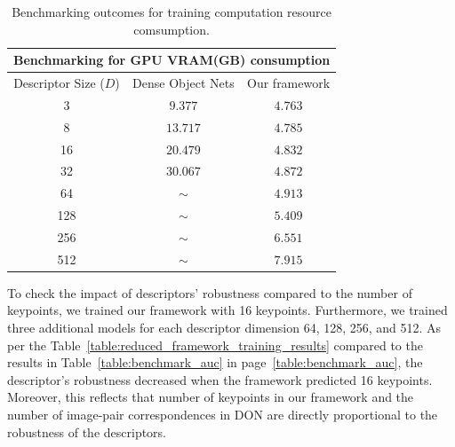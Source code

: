 \begin{table}[htb]
    \caption{Benchmarking outcomes for training computation resource comsumption.}
    \label{table:benchmark_gpu}
    \centering
    \begin{tabular}{ccc}
        \toprule
        \multicolumn{3}{c}{Benchmarking for GPU VRAM(GB) consumption} \\
        \midrule
        Descriptor Size ($D$) & Dense Object Nets & Our framework     \\ \hline
        3                     & $9.377$           & $\mathbf{4.763}$  \\
        8                     & $13.717$          & $\mathbf{4.785} $ \\
        16                    & $20.479$          & $\mathbf{4.832} $ \\
        32                    & $30.067$          & $\mathbf{4.872} $ \\
        64                    & $ \mathtt{\sim}$  & $4.913$           \\
        128                   & $ \mathtt{\sim}$  & $5.409 $          \\
        256                   & $ \mathtt{\sim}$  & $6.551 $          \\
        512                   & $ \mathtt{\sim}$  & $7.915 $          \\
        \bottomrule
    \end{tabular}
\end{table}

To check the impact of descriptors' robustness compared to the number of keypoints, we trained our framework with 16 keypoints.
Furthermore, we trained three additional models for each descriptor dimension 64, 128, 256, and 512.
As per the Table~\ref{table:reduced_framework_training_results} compared to the results in Table~\ref{table:benchmark_auc} in page~\ref{table:benchmark_auc},
the descriptor's robustness decreased when the framework predicted 16 keypoints.
Moreover, this reflects that number of keypoints in our framework and the number of image-pair correspondences in DON are directly proportional to the robustness of the descriptors.


